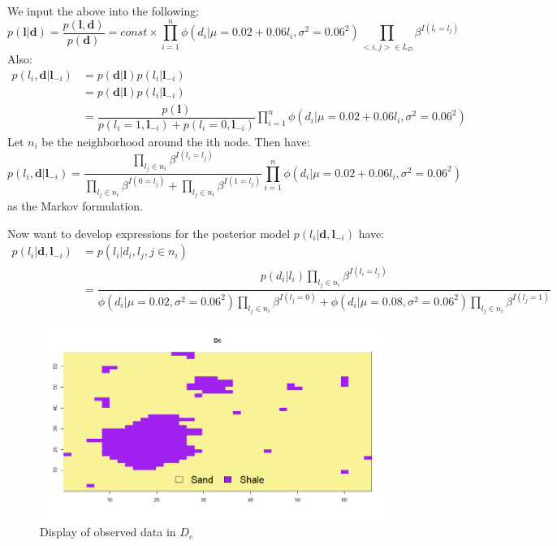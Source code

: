 \documentclass{article}
\newcommand{\vect}[1]{\ensuremath{\boldsymbol{\mathbf{#1}}}}
\begin{document}
	We input the above into the following:
	\begin{equation}
		p(\vect l | \vect d) = \dfrac{p(\vect l, \vect d)}{p(\vect d)} = const  \times \prod_{i=1}^{n}  \phi(d_i |\mu = 0.02 + 0.06l_i, \sigma^2 = 0.06^2) \prod_{<i, j>\in L_D} \beta^{I(l_i = l_j)}
	\end{equation}
	Also: 
	\begin{equation}
	\begin{split}
		p(l_i, \vect d | \vect l_{-i}) &= p(\vect d | \vect l)p(l_i | \vect l_{-i}) \\ &= p(\vect d | \vect l)p(l_i | \vect l_{-i}) \\ 
		&= 	\dfrac{p(\vect l)}{p(l_i = 1, \vect l_{-i}) +p(l_i = 0, \vect l_{-i})} 	\prod_{i=1}^{n}  \phi(d_i |\mu = 0.02 + 0.06l_i, \sigma^2 = 0.06^2) 
	\end{split}
	\end{equation}
	Let $n_i$ be the neighborhood around the ith node. Then have:
	\begin{equation}
		p(l_i, \vect d | \vect l_{-i}) = \dfrac{\prod_{l_j \in n_i}\beta^{I(l_i = l_j)}}{\prod_{l_j \in n_i}\beta^{I(0 = l_j)} + \prod_{l_j \in n_i}\beta^{I(1 = l_j)}} 	\prod_{i=1}^{n}  \phi(d_i |\mu = 0.02 + 0.06l_i, \sigma^2 = 0.06^2) 
	\end{equation} 
	as the Markov formulation. 
	
	Now want to develop expressions for the posterior model  $p(l_i | \vect d, \vect l_{-i})$ have:
	\begin{equation}
		\begin{split}
		p(l_i | \vect d, \vect l_{-i}) &= p(l_i | d_i, l_{j}, j \in n_i) 
		\\ &= \dfrac{p(d_i | l_i)\prod_{l_j \in n_i}\beta^{I(l_i = l_j)}}{\phi(d_i|\mu = 0.02, \sigma^2 = 0.06^2)\prod_{l_j \in n_i}\beta^{I(l_j = 0)} + \phi(d_i|\mu = 0.08, \sigma^2 = 0.06^2)\prod_{l_j \in n_i}\beta^{I(l_j = 1)}} 
		\end{split}		
	\end{equation} 
	

	
	\begin{figure}[h]	
		\begin{center} 
			\includegraphics[scale=0.48]{figure5.png}
		\end{center}
		\caption{Display of observed data in $D_c$ }
		\label{fig:1c1} 
	\end{figure}
\end{document}
